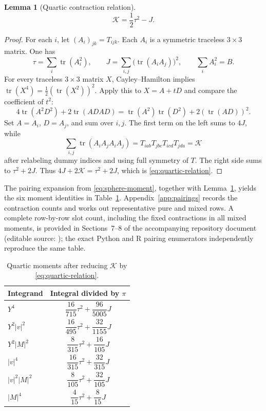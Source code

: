 \documentclass[11pt,reqno]{amsart}
\newtheorem{lemma}[theorem]{Lemma}
\theoremstyle{remark}
\newcommand{\tr}{\operatorname{tr}}
\newcommand{\abs}[1]{\left\lvert #1\right\rvert}
\begin{document}
\begin{lemma}[Quartic contraction relation]\label{lem:quartic-relation}
\begin{equation}\label{eq:quartic-relation}
 \mathcal K=\frac12\tau^2-J.
\end{equation}
\end{lemma}

\begin{proof}
For each $i$, let $(A_i)_{jk}=T_{ijk}$. Each $A_i$ is a symmetric traceless
$3\times3$ matrix. One has
\[
 \tau=\sum_i\tr(A_i^2),
 \qquad
 J=\sum_{i,j}\bigl(\tr(A_iA_j)\bigr)^2,
 \qquad
 \sum_iA_i^2=B.
\]
For every traceless $3\times3$ matrix $X$, Cayley--Hamilton implies
$\tr(X^4)=\tfrac12(\tr(X^2))^2$. Apply this to $X=A+tD$ and compare the
coefficient of $t^2$:
\[
 4\tr(A^2D^2)+2\tr(ADAD)
 =\tr(A^2)\tr(D^2)+2(\tr(AD))^2.
\]
Set $A=A_i$, $D=A_j$, and sum over $i,j$. The first term on the left sums to
$4J$, while
\[
 \sum_{i,j}\tr(A_iA_jA_iA_j)
 =T_{iab}T_{jbc}T_{icd}T_{jda}=\mathcal K
\]
after relabeling dummy indices and using full symmetry of $T$. The right side
sums to $\tau^2+2J$. Thus $4J+2\mathcal K=\tau^2+2J$, which is
\eqref{eq:quartic-relation}.
\end{proof}

The pairing expansion from \eqref{eq:sphere-moment}, together with
Lemma~\ref{lem:quartic-relation}, yields the six moment identities in
Table~\ref{tab:moments}. Appendix~\ref{app:pairings} records the contraction
counts and works out representative pure and mixed rows. A complete row-by-row
slot count, including the fixed contractions in all mixed moments, is provided
in Sections~7--8 of the accompanying repository document
 (editable source:
); the exact Python and R pairing
enumerators independently reproduce the same table.

\begin{table}[ht]
\centering
\caption{Quartic moments after reducing $\mathcal K$ by
\eqref{eq:quartic-relation}.}
\label{tab:moments}
\begin{tabular}{@{}lc@{}}
\toprule
Integrand & Integral divided by $\pi$ \\
\midrule
$Y^4$ & $\dfrac{16}{715}\tau^2+\dfrac{96}{5005}J$ \\[1.2ex]
$Y^2\abs{v}^2$ & $\dfrac{16}{495}\tau^2+\dfrac{32}{1155}J$ \\[1.2ex]
$Y^2\abs{M}^2$ & $\dfrac{8}{315}\tau^2+\dfrac{16}{105}J$ \\[1.2ex]
$\abs{v}^4$ & $\dfrac{16}{315}\tau^2+\dfrac{32}{315}J$ \\[1.2ex]
$\abs{v}^2\abs{M}^2$ & $\dfrac{8}{105}\tau^2+\dfrac{32}{105}J$ \\[1.2ex]
$\abs{M}^4$ & $\dfrac{4}{15}\tau^2+\dfrac{8}{15}J$ \\
\bottomrule
\end{tabular}
\end{table}
\end{document}
